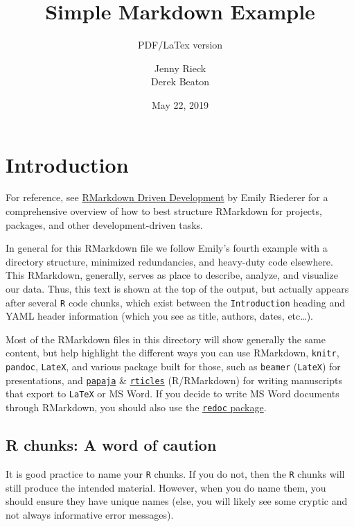 \documentclass[]{article}
\title{Simple Markdown Example}
\subtitle{PDF/LaTex version}
\author{Jenny Rieck \\ Derek Beaton}
\date{May 22, 2019}
\begin{document}
\maketitle

\hypertarget{introduction}{%
\section{Introduction}\label{introduction}}

For reference, see
\href{https://emilyriederer.netlify.com/post/rmarkdown-driven-development/}{RMarkdown
Driven Development} by Emily Riederer for a comprehensive overview of
how to best structure RMarkdown for projects, packages, and other
development-driven tasks.

In general for this RMarkdown file we follow Emily's fourth example with
a directory structure, minimized redundancies, and heavy-duty code
elsewhere. This RMarkdown, generally, serves as place to describe,
analyze, and visualize our data. Thus, this text is shown at the top of
the output, but actually appears after several \texttt{R} code chunks,
which exist between the \texttt{Introduction} heading and YAML header
information (which you see as title, authors, dates, etc\ldots{}).

Most of the RMarkdown files in this directory will show generally the
same content, but help highlight the different ways you can use
RMarkdown, \texttt{knitr}, \texttt{pandoc}, \texttt{LateX}, and various
package built for those, such as \texttt{beamer} (\texttt{LateX}) for
presentations, and
\href{https://github.com/crsh/papaja}{\texttt{papaja}} \&
\href{https://github.com/rstudio/rticles}{\texttt{rticles}}
(R/RMarkdown) for writing manuscripts that export to \texttt{LaTeX} or
MS Word. If you decide to write MS Word documents through RMarkdown, you
should also use the
\href{https://github.com/noamross/redoc}{\texttt{redoc} package}.

\hypertarget{r-chunks-a-word-of-caution}{%
\subsection{R chunks: A word of
caution}\label{r-chunks-a-word-of-caution}}

It is good practice to name your \texttt{R} chunks. If you do not, then
the \texttt{R} chunks will still produce the intended material. However,
when you do name them, you should ensure they have unique names (else,
you will likely see some cryptic and not always informative error
messages).
\end{document}
